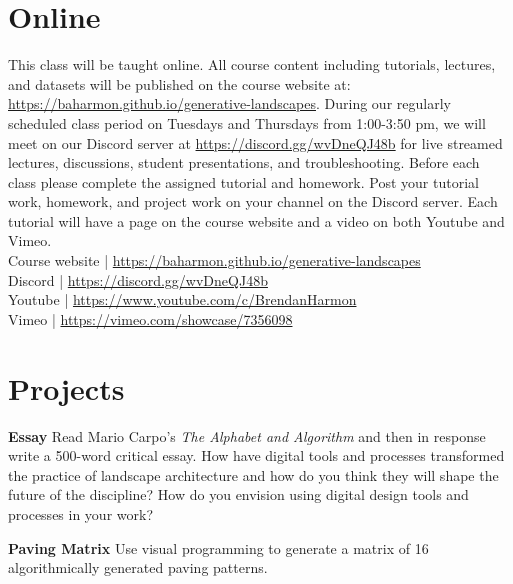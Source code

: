 \documentclass[11pt,article,oneside]{memoir}
\begin{document}
\clearpage

\section{Online}

This class will be taught online.
All course content including tutorials, lectures, and datasets
will be published on the course website at:
\url{https://baharmon.github.io/generative-landscapes}.
During our regularly scheduled class period on Tuesdays and Thursdays from 1:00-3:50 pm,
we will meet on our Discord server at \url{https://discord.gg/wvDneQJ48b}
for live streamed lectures, discussions, student presentations, and troubleshooting. 
Before each class please complete the assigned tutorial and homework. 
Post your tutorial work, homework, and project work 
on your channel on the Discord server. 
Each tutorial will have a page on the course website
and a video on both Youtube and Vimeo. \\

\noindent
Course website | \url{https://baharmon.github.io/generative-landscapes}\\
Discord | \url{https://discord.gg/wvDneQJ48b}\\
Youtube | \url{https://www.youtube.com/c/BrendanHarmon}\\
Vimeo | \url{https://vimeo.com/showcase/7356098}\\


\section{Projects}

\noindent \textbf{Essay}
Read Mario Carpo's \emph{The Alphabet and Algorithm}
and then in response write a 500-word critical essay.
How have digital tools and processes transformed 
the practice of landscape architecture
and how do you think they will shape 
the future of the discipline?
How do you envision using
digital design tools and processes in your work?

\nocite{*} \printbibliography[keyword=intro, heading=none]

\noindent \textbf{Paving Matrix}
Use visual programming to generate
a matrix of 16 algorithmically generated paving patterns.
\\
\end{document}
